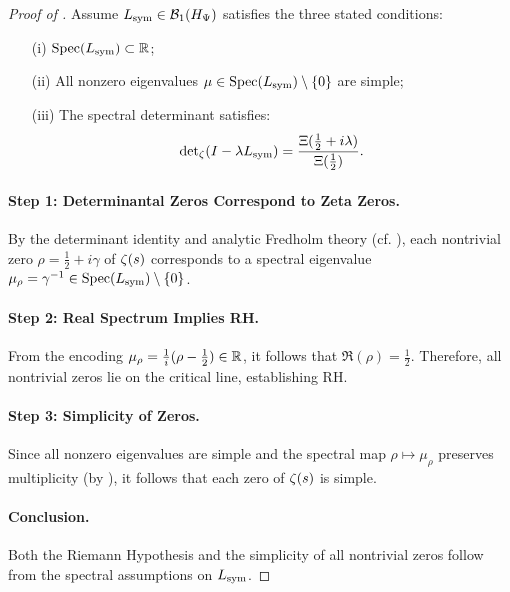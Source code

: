 \begin{proof}[Proof of ]
Assume \( L_{\mathrm{sym}} \in \mathcal{B}_1(H_{\Psi}) \) satisfies the three stated conditions:
\begin{enumerate}
  \item[\textup{(i)}] \( \operatorname{Spec}(L_{\mathrm{sym}}) \subset \mathbb{R} \);
  \item[\textup{(ii)}] All nonzero eigenvalues \( \mu \in \operatorname{Spec}(L_{\mathrm{sym}}) \setminus \{0\} \) are simple;
  \item[\textup{(iii)}] The spectral determinant satisfies:
  \[
  \det\nolimits_\zeta(I - \lambda L_{\mathrm{sym}}) = \frac{\Xi(\tfrac{1}{2} + i\lambda)}{\Xi(\tfrac{1}{2})}.
  \]
\end{enumerate}

\paragraph{Step 1: Determinantal Zeros Correspond to Zeta Zeros.}
By the determinant identity and analytic Fredholm theory (cf. ), each nontrivial zero \( \rho = \tfrac{1}{2} + i\gamma \) of \( \zeta(s) \) corresponds to a spectral eigenvalue \( \mu_\rho = \gamma^{-1} \in \operatorname{Spec}(L_{\mathrm{sym}}) \setminus \{0\} \).

\paragraph{Step 2: Real Spectrum Implies RH.}
From the encoding \( \mu_\rho = \tfrac{1}{i}(\rho - \tfrac{1}{2}) \in \mathbb{R} \), it follows that \( \Re(\rho) = \tfrac{1}{2} \). Therefore, all nontrivial zeros lie on the critical line, establishing RH.

\paragraph{Step 3: Simplicity of Zeros.}
Since all nonzero eigenvalues are simple and the spectral map \( \rho \mapsto \mu_\rho \) preserves multiplicity (by ), it follows that each zero of \( \zeta(s) \) is simple.

\paragraph{Conclusion.}
Both the Riemann Hypothesis and the simplicity of all nontrivial zeros follow from the spectral assumptions on \( L_{\mathrm{sym}} \).
\end{proof}
